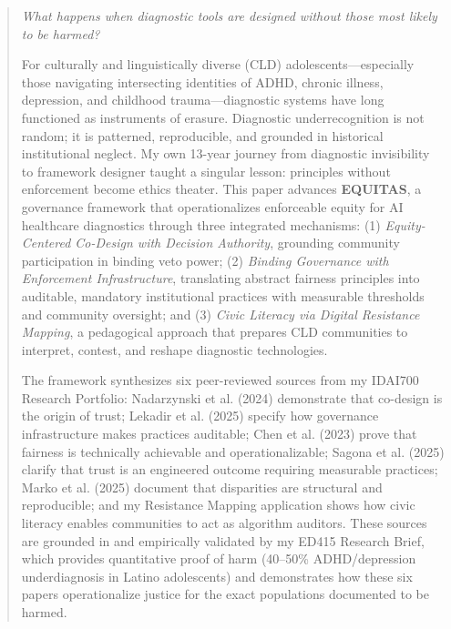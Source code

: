 \documentclass[12pt,a4paper]{article}
\begin{document}
\clearpage


\begin{abstract}

\textit{What happens when diagnostic tools are designed without those most likely to be harmed?}

For culturally and linguistically diverse (CLD) adolescents—especially those navigating intersecting identities of ADHD, chronic illness, depression, and childhood trauma—diagnostic systems have long functioned as instruments of erasure. Diagnostic underrecognition is not random; it is patterned, reproducible, and grounded in historical institutional neglect. My own 13-year journey from diagnostic invisibility to framework designer taught a singular lesson: principles without enforcement become ethics theater. This paper advances \textbf{EQUITAS}, a governance framework that operationalizes enforceable equity for AI healthcare diagnostics through three integrated mechanisms: (1) \textit{Equity-Centered Co-Design with Decision Authority}, grounding community participation in binding veto power; (2) \textit{Binding Governance with Enforcement Infrastructure}, translating abstract fairness principles into auditable, mandatory institutional practices with measurable thresholds and community oversight; and (3) \textit{Civic Literacy via Digital Resistance Mapping}, a pedagogical approach that prepares CLD communities to interpret, contest, and reshape diagnostic technologies.

\vspace{0.5em}

The framework synthesizes six peer-reviewed sources from my IDAI700 Research Portfolio: Nadarzynski et al. (2024) demonstrate that co-design is the origin of trust; Lekadir et al. (2025) specify how governance infrastructure makes practices auditable; Chen et al. (2023) prove that fairness is technically achievable and operationalizable; Sagona et al. (2025) clarify that trust is an engineered outcome requiring measurable practices; Marko et al. (2025) document that disparities are structural and reproducible; and my Resistance Mapping application shows how civic literacy enables communities to act as algorithm auditors. These sources are grounded in and empirically validated by my ED415 Research Brief, which provides quantitative proof of harm (40--50\% ADHD/depression underdiagnosis in Latino adolescents) and demonstrates how these six papers operationalize justice for the exact populations documented to be harmed.


\end{abstract}
\end{document}
